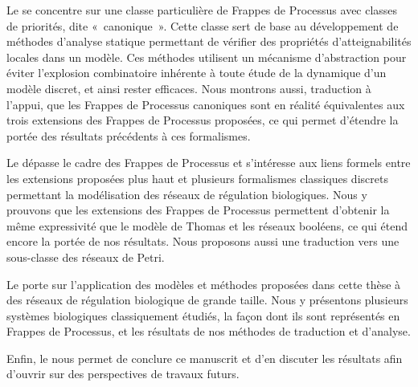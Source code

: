 Le  se concentre sur une classe particulière de Frappes de Processus avec classes
de priorités, dite «~canonique~».
Cette classe sert de base au développement de méthodes d'analyse statique permettant
de vérifier des propriétés d'atteignabilités locales dans un modèle.
Ces méthodes utilisent un mécanisme d'abstraction pour éviter l'explosion combinatoire
inhérente à toute étude de la dynamique d'un modèle discret, et ainsi rester efficaces.
Nous montrons aussi, traduction à l'appui,
que les Frappes de Processus canoniques sont en réalité équivalentes
aux trois extensions des Frappes de Processus proposées,
ce qui permet d'étendre la portée des résultats précédents à ces formalismes.

Le  dépasse le cadre des Frappes de Processus et s'intéresse aux liens
formels entre les extensions proposées plus haut et plusieurs formalismes classiques discrets
permettant la modélisation des réseaux de régulation biologiques.
Nous y prouvons que les extensions des Frappes de Processus permettent d'obtenir la même
expressivité que le modèle de Thomas et les réseaux booléens,
ce qui étend encore la portée de nos résultats.
Nous proposons aussi une traduction vers une sous-classe des réseaux de Petri.

Le  porte sur l'application des modèles et méthodes proposées
dans cette thèse à des réseaux de régulation biologique de grande taille.
Nous y présentons plusieurs systèmes biologiques classiquement étudiés,
la façon dont ils sont représentés en Frappes de Processus,
et les résultats de nos méthodes de traduction et d'analyse.

Enfin, le  nous permet de conclure ce manuscrit
et d'en discuter les résultats afin d'ouvrir sur des perspectives de travaux futurs.
